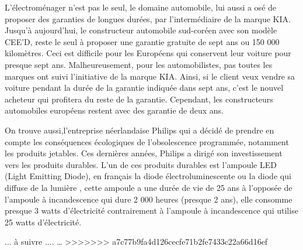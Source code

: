 L’électroménager n'est pas le seul, le domaine automobile, lui aussi a osé de proposer  des garanties de longues durées, par l’intermédiaire de la marque KIA. Jusqu’à aujourd'hui, le constructeur automobile sud-coréen avec son modèle CEE’D, reste le seul à proposer une garantie gratuite de sept ans ou 150 000 kilomètres. Ceci est difficile pour les Européens qui conservent leur voiture pour presque sept ans. Malheureusement, pour les automobilistes, pas toutes les marques ont suivi l’initiative de la marque KIA. Ainsi, si le client veux vendre sa voiture pendant la durée de la garantie indiquée dans sept ans, c'est le nouvel acheteur qui profitera du reste de la garantie. Cependant, les constructeurs automobiles européens restent avec des garantie de deux ans.

On trouve aussi,l'entreprise néerlandaise Philips qui a décidé de prendre en compte les conséquences écologiques de l'obsolescence programmée, notamment les produits jetables. Ces dernières années, Philips a dirigé son investissement vers  les produits durables. L'un de ces produits durables est l’ampoule LED (Light Emitting Diode), en français la diode électroluminescente ou la diode qui  diffuse de la lumière , cette ampoule a une durée de vie de 25 ans à l'opposée de l'ampoule à incandescence qui dure 2 000 heures (presque 2 ans), elle consomme presque 3 watts d’électricité contrairement à l'ampoule à incandescence qui utilise 25 watts d’électricité. 

... à suivre ....
… 
>>>>>>> a7c77b9fa4d126cecfe71b2fe7433c22a66d16ef
